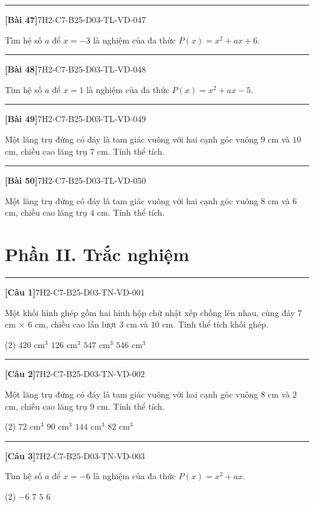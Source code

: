 \documentclass[12pt,a4paper]{article}
\newif\ifloigiai
\newenvironment{cauhoi}[2]{%
  \par\medskip\noindent\rule{\textwidth}{0.4pt}\par\nopagebreak
  \noindent\textbf{[#1]}\hfill{\scriptsize\ttfamily #2}\par\nopagebreak\smallskip}{\par}
\newcommand{\loigiai}[1]{\ifloigiai\par\smallskip\noindent\textit{Lời giải.} #1\par\fi}
\newcommand{\dapan}[1]{\ifloigiai\par\smallskip\noindent\textit{Đáp án:} \textbf{#1}\par\fi}
\begin{document}
\begin{cauhoi}{Bài 47}{7H2-C7-B25-D03-TL-VD-047}
Tìm hệ số $a$ để $x=-3$ là nghiệm của đa thức $P(x)=x^{2}+ax+6$.
\loigiai{$x=-3$ là nghiệm nên $P(-3)=0$: $9-3\cdot a+6=0$ nên $-3a=-15$, suy ra $a=5$.}
\end{cauhoi}
\begin{cauhoi}{Bài 48}{7H2-C7-B25-D03-TL-VD-048}
Tìm hệ số $a$ để $x=1$ là nghiệm của đa thức $P(x)=x^{2}+ax-5$.
\loigiai{$x=1$ là nghiệm nên $P(1)=0$: $1+1\cdot a-5=0$ nên $a=4$, suy ra $a=4$.}
\end{cauhoi}
\begin{cauhoi}{Bài 49}{7H2-C7-B25-D03-TL-VD-049}
Một lăng trụ đứng có đáy là tam giác vuông với hai cạnh góc vuông $9$ cm và $10$ cm, chiều cao lăng trụ $7$ cm. Tính thể tích.
\loigiai{Diện tích đáy là $\dfrac{9\cdot 10}{2}=45$ ($\text{cm}^2$). Thể tích là $45\cdot 7=315$ ($\text{cm}^3$).}
\end{cauhoi}
\begin{cauhoi}{Bài 50}{7H2-C7-B25-D03-TL-VD-050}
Một lăng trụ đứng có đáy là tam giác vuông với hai cạnh góc vuông $8$ cm và $6$ cm, chiều cao lăng trụ $4$ cm. Tính thể tích.
\loigiai{Diện tích đáy là $\dfrac{8\cdot 6}{2}=24$ ($\text{cm}^2$). Thể tích là $24\cdot 4=96$ ($\text{cm}^3$).}
\end{cauhoi}
\clearpage\section*{Phần II. Trắc nghiệm}
\begin{cauhoi}{Câu 1}{7H2-C7-B25-D03-TN-VD-001}
Một khối hình ghép gồm hai hình hộp chữ nhật xếp chồng lên nhau, cùng đáy $7$ cm $\times$ $6$ cm, chiều cao lần lượt $3$ cm và $10$ cm. Tính thể tích khối ghép.
\begin{tasks}(2)
\task $420\text{ cm}^3$
\task $126\text{ cm}^3$
\task $547\text{ cm}^3$
\task $546\text{ cm}^3$
\end{tasks}
\dapan{D}
\end{cauhoi}
\begin{cauhoi}{Câu 2}{7H2-C7-B25-D03-TN-VD-002}
Một lăng trụ đứng có đáy là tam giác vuông với hai cạnh góc vuông $8$ cm và $2$ cm, chiều cao lăng trụ $9$ cm. Tính thể tích.
\begin{tasks}(2)
\task $72\text{ cm}^3$
\task $90\text{ cm}^3$
\task $144\text{ cm}^3$
\task $82\text{ cm}^3$
\end{tasks}
\dapan{A}
\end{cauhoi}
\begin{cauhoi}{Câu 3}{7H2-C7-B25-D03-TN-VD-003}
Tìm hệ số $a$ để $x=-6$ là nghiệm của đa thức $P(x)=x^{2}+ax$.
\begin{tasks}(2)
\task $-6$
\task $7$
\task $5$
\task $6$
\end{tasks}
\dapan{D}
\end{cauhoi}
\end{document}
